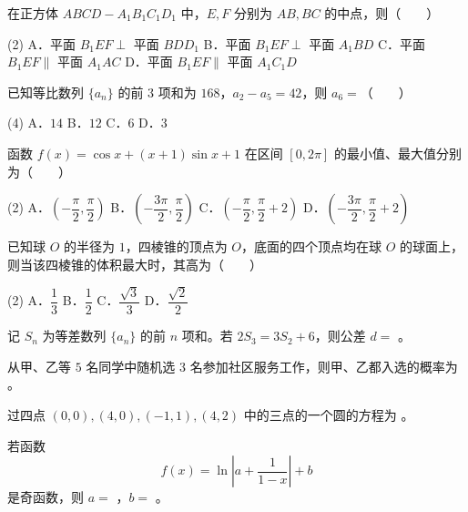 \begin{question}
在正方体 $ABCD-A_1B_1C_1D_1$ 中，$E,F$ 分别为 $AB,BC$ 的中点，则\mbox{（　　）}

\begin{gkopts}(2)
\task A．平面 $B_1EF\perp$ 平面 $BDD_1$
\task B．平面 $B_1EF\perp$ 平面 $A_1BD$
\task C．平面 $B_1EF\parallel$ 平面 $A_1AC$
\task D．平面 $B_1EF\parallel$ 平面 $A_1C_1D$
\end{gkopts}

\end{question}
\begin{question}
已知等比数列 $\{a_n\}$ 的前 $3$ 项和为 $168$，$a_2-a_5=42$，则 $a_6=$\mbox{（　　）}

\begin{gkopts}(4)
\task A．$14$
\task B．$12$
\task C．$6$
\task D．$3$
\end{gkopts}

\end{question}
\begin{question}
函数 $f(x)=\cos x+(x+1)\sin x+1$ 在区间 $[0,2\pi]$ 的最小值、最大值分别为\mbox{（　　）}

\begin{gkopts}(2)
\task A．$\left(-\dfrac\pi2,\dfrac\pi2\right)$
\task B．$\left(-\dfrac{3\pi}2,\dfrac\pi2\right)$
\task C．$\left(-\dfrac\pi2,\dfrac\pi2+2\right)$
\task D．$\left(-\dfrac{3\pi}2,\dfrac\pi2+2\right)$
\end{gkopts}

\end{question}
\begin{question}
已知球 $O$ 的半径为 $1$，四棱锥的顶点为 $O$，底面的四个顶点均在球 $O$ 的球面上，则当该四棱锥的体积最大时，其高为\mbox{（　　）}

\begin{gkopts}(2)
\task A．$\dfrac13$
\task B．$\dfrac12$
\task C．$\dfrac{\sqrt3}{3}$
\task D．$\dfrac{\sqrt2}{2}$
\end{gkopts}

\end{question}

\begin{question}
记 $S_n$ 为等差数列 $\{a_n\}$ 的前 $n$ 项和。若 $2S_3=3S_2+6$，则公差 $d=$ \gkblank{}。

\end{question}
\begin{question}
从甲、乙等 $5$ 名同学中随机选 $3$ 名参加社区服务工作，则甲、乙都入选的概率为 \gkblank{}。

\end{question}
\begin{question}
过四点 $(0,0),(4,0),(-1,1),(4,2)$ 中的三点的一个圆的方程为 \gkblank{}。

\end{question}
\begin{question}
若函数
\nopagebreak[4]
\[
f(x)=\ln\left|a+\frac{1}{1-x}\right|+b
\]
是奇函数，则 $a=$ \gkblank{}，$b=$ \gkblank{}。

\end{question}


